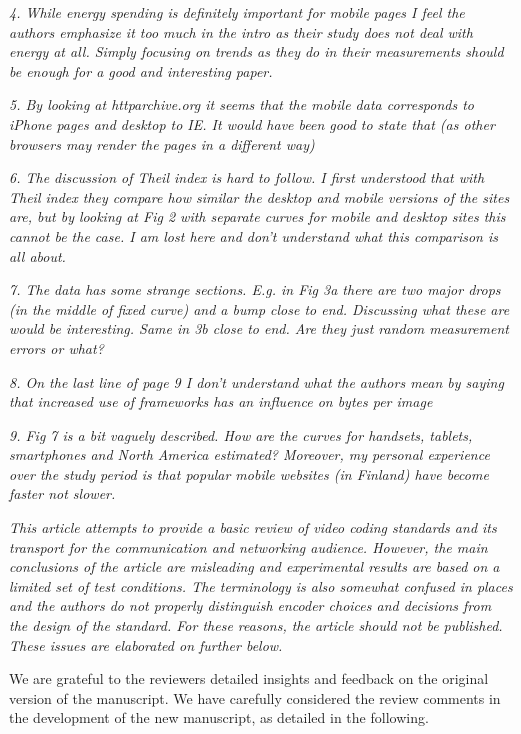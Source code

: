 \documentclass[11pt, draftclsnofoot, onecolumn]{IEEEtran}
\begin{document}
{{\noindent \textit{4. While energy spending is definitely important for mobile pages I feel the authors emphasize it too much in the intro as their study does not deal with energy at all. Simply focusing on trends as they do in their measurements should be enough for a good and interesting paper. }


\noindent \textit{5. By looking at httparchive.org it seems that the mobile data corresponds to iPhone pages and desktop to IE. It would have been good to state that (as other browsers may render the pages in a different way)}


\noindent \textit{6. The discussion of Theil index is hard to follow. I first understood that with Theil index they compare how similar the desktop and mobile versions of the sites are, but by looking at Fig 2 with separate curves for mobile and desktop sites this cannot be the case. I am lost here and don't understand what this comparison is all about.}


\noindent \textit{7. The data has some strange sections. E.g. in Fig 3a there are two major drops (in the middle of fixed curve) and a bump close to end. Discussing what these are would be interesting. Same in 3b close to end. Are they just random measurement errors or what?}


\noindent \textit{8. On the last line of page 9 I don't understand what the authors mean by saying that increased use of frameworks has an influence on bytes per image}


\noindent \textit{9. Fig 7 is a bit vaguely described. How are the curves for handsets, tablets, smartphones and North America estimated? Moreover, my personal experience over the study period is that popular mobile websites (in Finland) have become faster not slower.}


\noindent \textit{This article attempts to provide a basic review of
  video coding standards and its transport for the communication and
  networking audience. However, the main conclusions of the article
  are misleading and experimental results are based on a limited set
  of test conditions. The terminology is also somewhat confused in
  places and the authors do not properly distinguish encoder choices
  and decisions from the design of the standard. For these reasons,
  the article should not be published. These issues are elaborated on
  further below.}

We are grateful to the reviewers detailed insights and feedback on
the original version of the manuscript. We have carefully
considered the review comments in the development of the
new manuscript, as detailed in the following.\\

}}
\end{document}
